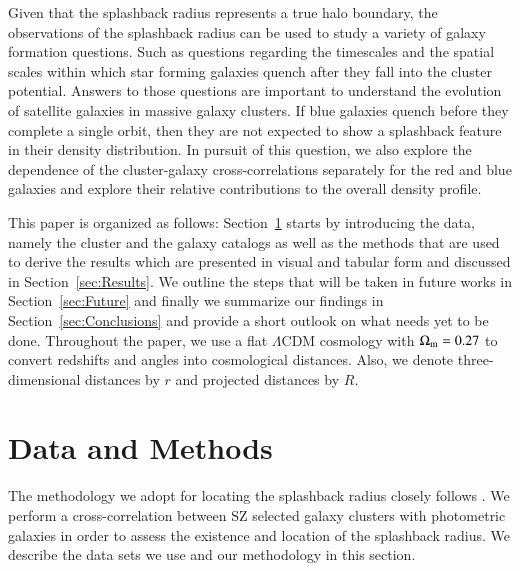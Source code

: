 \documentclass[iop, apjl, twocolappendix, numberedappendix]{emulateapj}
\begin{document}

Given that the splashback radius represents a true halo boundary,
the observations of the splashback radius can be used to study a
variety of galaxy formation questions. Such as questions 
regarding the timescales and the spatial scales within
which star forming galaxies quench after they fall into the cluster
potential. Answers to those questions are important to understand 
the evolution of satellite galaxies in massive galaxy clusters. 
If blue galaxies quench before
they complete a single orbit, then they are not expected to show a
splashback feature in their density distribution. In pursuit of this
question, we also explore the dependence of the cluster-galaxy
cross-correlations separately for the red and blue galaxies and
explore their relative contributions to the overall density profile.

This paper is organized as follows: Section~\ref{sec:Methods} starts
by introducing the data, namely the cluster and the galaxy catalogs
as well as the methods that are used to derive the results which are
presented in visual and tabular form and  discussed in
Section~\ref{sec:Results}. We outline the steps that will be taken
in future works in Section~\ref{sec:Future} and finally we summarize
our findings in Section~\ref{sec:Conclusions} and provide a short
outlook on what needs yet to be done. Throughout the paper, we use a
flat $\Lambda$CDM cosmology with $\Omega_{\rm m}=0.27$ to convert
redshifts and angles into cosmological distances. Also, we denote 
three-dimensional distances by $r$ and projected distances by $R$.


\section{Data and Methods}
\label{sec:Methods}
The methodology we adopt for locating the splashback radius closely
follows \citet{more2016detection}. We perform a cross-correlation
between SZ selected galaxy clusters with photometric galaxies in
order to assess the existence and location of the splashback radius.
We describe the data sets we use and our methodology in this
section.
\end{document}
